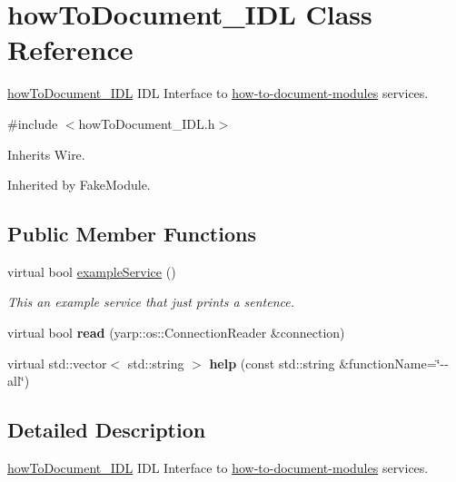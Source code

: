 \section{how\+To\+Document\+\_\+\+I\+DL Class Reference}
\label{classhowToDocument__IDL}


\hyperlink{classhowToDocument__IDL}{how\+To\+Document\+\_\+\+I\+DL} I\+DL Interface to \hyperlink{group__how-to-document-modules}{how-\/to-\/document-\/modules} services.  




{\ttfamily \#include $<$how\+To\+Document\+\_\+\+I\+D\+L.\+h$>$}



Inherits Wire.



Inherited by Fake\+Module.

\subsection*{Public Member Functions}
\begin{DoxyCompactItemize}
\item 
virtual bool \hyperlink{classhowToDocument__IDL_a530964d66092c8ddbcfb194d7d89b733}{example\+Service} ()
\begin{DoxyCompactList}\small\item\em This an example service that just prints a sentence. \end{DoxyCompactList}\item 
virtual bool {\bfseries read} (yarp\+::os\+::\+Connection\+Reader \&connection)\label{classhowToDocument__IDL_a411a8a318dcff4b8507f371d3f66fbf7}

\item 
virtual std\+::vector$<$ std\+::string $>$ {\bfseries help} (const std\+::string \&function\+Name=\char`\"{}-\/-\/all\char`\"{})\label{classhowToDocument__IDL_af9391f5fdb4547d3e1404b1b44dba42e}

\end{DoxyCompactItemize}


\subsection{Detailed Description}
\hyperlink{classhowToDocument__IDL}{how\+To\+Document\+\_\+\+I\+DL} I\+DL Interface to \hyperlink{group__how-to-document-modules}{how-\/to-\/document-\/modules} services. 

